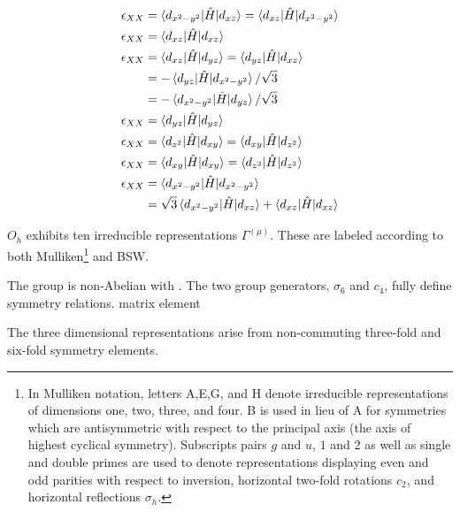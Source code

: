 \documentclass[twocolumn,showpacs,preprintnumbers,superscriptaddress,prb,floatfix,aps,10pt]{revtex4-1}
\newcommand*{\ham}{\hat{H}}
\begin{document}
\begin{align}
\epsilon_{XX} &
= \braket{d_{x^2-y^2} | \ham | d_{xz}}
= \braket{d_{xz} | \ham | d_{x^2-y^2}} \\
\epsilon_{XX} &
= \braket{d_{xz} | \ham | d_{xz}} \\
\epsilon_{XX} &
= \braket{d_{xz} | \ham | d_{yz}}
= \braket{d_{yz} | \ham | d_{xz}} \\
&
=-\braket{d_{yz} | \ham | d_{x^2-y^2}}/\sqrt{3} \\
&
=-\braket{d_{x^2-y^2} | \ham | d_{yz}}/\sqrt{3} \\
\epsilon_{XX} &
= \braket{d_{yz} | \ham | d_{yz}} \\
\epsilon_{XX} &
= \braket{d_{z^2}| \ham | d_{xy}}
= \braket{d_{xy} | \ham | d_{z^2}} \\
\epsilon_{XX} &
= \braket{d_{xy}  | \ham | d_{xy}}
= \braket{d_{z^2} | \ham | d_{z^2}} \\
\epsilon_{XX} &
= \braket{d_{x^2-y^2} | \ham | d_{x^2-y^2}} \\
&
= \sqrt{3} \braket{d_{x^2-y^2} | \ham | d_{xz}} 
         + \braket{d_{xz}      | \ham | d_{xz}} \\
\end{align}





$O_h$ exhibits ten irreducible representations $\Gamma^{(\mu)}$. These are labeled according to both Mulliken\footnote{In Mulliken notation, letters A,E,G, and H denote irreducible representations of dimensions one, two, three, and four. B is used in lieu of A for symmetries which are antisymmetric with respect to the principal axis (the axis of highest cyclical symmetry). Subscripts pairs $g$ and $u$, $1$ and $2$ as well as single and double primes are used to denote representations displaying even and odd parities with respect to inversion, horizontal two-fold rotations $c_2$, and horizontal reflections $\sigma_h$.} and BSW.


The group is non-Abelian with . The two group generators, $\sigma_6$ and $c_4$, fully define symmetry relations.
matrix element 


The three dimensional representations arise from non-commuting three-fold and six-fold symmetry elements. 
\end{document}
